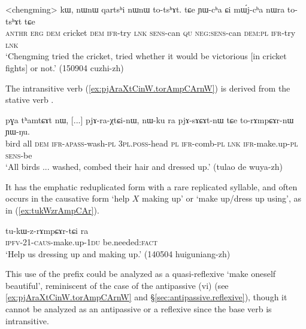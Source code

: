 \begin{exe}
\ex \label{ex:YWcha.Ci.mWjcha.totshAt}
\gll <chengming> kɯ, nɯnɯ qartsʰi nɯnɯ to-tsʰɤt. tɕe ɲɯ-cʰa ɕi mɯ́j-cʰa nɯra to-tsʰɤt tɕe  \\
\textsc{anthr} \textsc{erg} \textsc{dem} cricket \textsc{dem} \textsc{ifr}-try \textsc{lnk} \textsc{sens}-can \textsc{qu} \textsc{neg}:\textsc{sens}-can \textsc{dem}:\textsc{pl} \textsc{ifr}-try \textsc{lnk} \\
\glt `Chengming tried the cricket, tried whether it would be victorious [in cricket fights] or not.'  (150904 cuzhi-zh)
\end{exe}
 
The intransitive verb  (\ref{ex:pjAraXtCinW.torAmpCArnW}) is derived from the stative verb .

\begin{exe}
\ex \label{ex:pjAraXtCinW.torAmpCArnW}
\gll pɣa tʰamtɕɤt nɯ, [...] pjɤ-ra-χtɕi-nɯ, nɯ-ku ra pjɤ-sɤɕɤt-nɯ tɕe to-rɤmpɕɤr-nɯ ɲɯ-ŋu. \\
bird all \textsc{dem} {  } \textsc{ifr}-\textsc{apass}-wash-\textsc{pl} \textsc{3pl}.\textsc{poss}-head \textsc{pl} \textsc{ifr}-comb-\textsc{pl} \textsc{lnk} \textsc{ifr}-make.up-\textsc{pl} \textsc{sens}-be \\
\glt `All birds ... washed, combed their hair and dressed up.' (tulao de wuya-zh)
\end{exe}

It has the emphatic reduplicated form  with a rare  replicated syllable, and  often occurs in the causative form  `help $X$ making up' or `make up/dress up using', as in (\ref{ex:tukWzrAmpCAr}).

\begin{exe}
\ex \label{ex:tukWzrAmpCAr}
\gll tu-kɯ-z-rɤmpɕɤr-tɕi ra \\
\textsc{ipfv}-2\fl{}1-\textsc{caus}-make.up-\textsc{1du} be.needed:\textsc{fact} \\
\glt `Help us dressing up and making up.' (140504 huiguniang-zh) 
\end{exe}
 
This use of the  prefix could be analyzed as a quasi-reflexive `make oneself beautiful', reminiscent of the case of the antipassive  (vi) (see \ref{ex:pjAraXtCinW.torAmpCArnW} and §\ref{sec:antipassive.reflexive}), though it cannot be analyzed as an antipassive or a reflexive since the base verb is intransitive.

